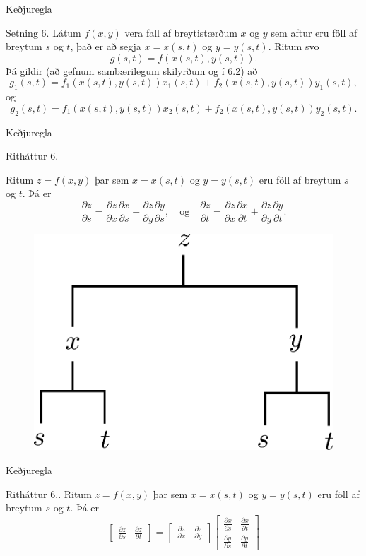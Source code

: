 \begin{frame}{Keðjuregla} 

\begin {block}{Setning 6.}
 Látum $f(x,y)$ vera fall af breytistærðum $x$ og $y$ sem aftur eru föll af breytum $s$ og $t$, það er að segja 
$x=x(s,t)$ og $y=y(s,t)$.  Ritum svo 
$$g(s,t)=f(x(s,t),y(s,t)).$$
Þá gildir (að gefnum sambærilegum skilyrðum og í 6.2) að
$$g_1(s,t)=f_1(x(s,t),y(s,t))x_1(s,t)+f_2(x(s,t),y(s,t))y_1(s,t),$$
og 
$$g_2(s,t)=f_1(x(s,t),y(s,t))x_2(s,t)+f_2(x(s,t),y(s,t))y_2(s,t).$$
\end{block}

\end{frame}

\begin{frame}{Keðjuregla} 

\begin {block}{Ritháttur 6.}

Ritum $z=f(x,y)$ þar sem $x=x(s,t)$ og $y=y(s,t)$ eru föll af breytum $s$ og  $t$.  Þá er 
$$\frac{\partial z}{\partial s}=
\frac{\partial z}{\partial x}\frac{\partial x}{\partial s}
+\frac{\partial z}{\partial y}\frac{\partial y}{\partial s}, \quad \text{og}\quad \frac{\partial z}{\partial t}=
\frac{\partial z}{\partial x}\frac{\partial x}{\partial t}
+\frac{\partial z}{\partial y}\frac{\partial y}{\partial t}.$$
\end{block}
 \begin{figure}[h!]
           \centering
            \includegraphics[width=0.35\linewidth]{chain2}
    \end{figure}
\end{frame}

\begin{frame}{Keðjuregla} 

\begin {block}{Ritháttur 6..}
 Ritum $z=f(x,y)$ þar sem $x=x(s,t)$ og $y=y(s,t)$ eru föll af breytum $s$ og  $t$.  Þá er 
$$\begin{bmatrix}\frac{\partial z}{\partial s} 
& \frac{\partial z}{\partial t}\end{bmatrix}
=\begin{bmatrix}\frac{\partial z}{\partial x} 
& \frac{\partial z}{\partial y}\end{bmatrix}
\begin{bmatrix}\frac{\partial x}{\partial s} 
& \frac{\partial x}{\partial t}\\
\frac{\partial y}{\partial s} 
& \frac{\partial y}{\partial t}
\end{bmatrix}$$
\end{block}
 
\end{frame}

